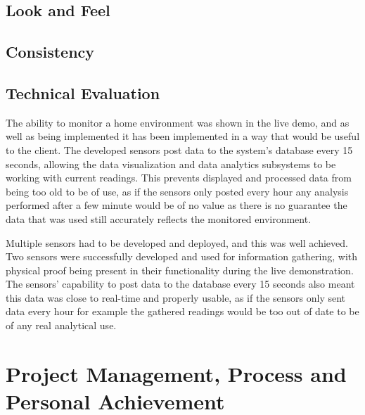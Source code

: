\documentclass[]{report}
\begin{document}
	\subsection{Look and Feel}
	
	
	\subsection{Consistency}
	
	
	\subsection{Technical Evaluation}
	
	
	
	
	
	The ability to monitor a home environment was shown in the live demo, and as well as being implemented it has been implemented in a way that would be useful to the client. The developed sensors post data to the system's database every 15 seconds, allowing the data visualization and data analytics subsystems to be working with current readings. This prevents displayed and processed data from being too old to be of use, as if the sensors only posted every hour any analysis performed after a few minute would be of no value as there is no guarantee the data that was used still accurately reflects the monitored environment.
	
	
	
	
	
	Multiple sensors had to be developed and deployed, and this was well achieved. Two sensors were successfully developed and used for information gathering, with physical proof being present in their functionality during the live demonstration. The sensors' capability to post data to the database every 15 seconds also meant this data was close to real-time and properly usable, as if the sensors only sent data every hour for example the gathered readings would be too out of date to be of any real analytical use. 
	
	
	
	


\section{Project Management, Process and Personal Achievement}
\end{document}

